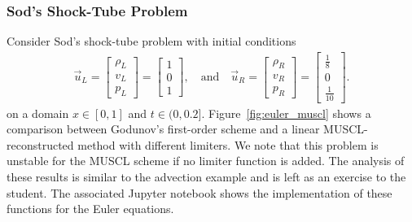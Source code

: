 \subsubsection{Sod's Shock-Tube Problem}
Consider Sod's shock-tube problem with initial conditions
\begin{align}
	\vec u_L = 
	\begin{bmatrix}
		\rho_L \\ v_L \\ p_L 
	\end{bmatrix}
	= 
	\begin{bmatrix}
		1 \\ 0 \\ 1
	\end{bmatrix},
	\quad \text{and} \quad 
	\vec u_R = 
	\begin{bmatrix}
		\rho_R \\ v_R \\ p_R
	\end{bmatrix}
	= 
	\begin{bmatrix}
		\frac{1}{8} \\ 0 \\ \frac{1}{10}
	\end{bmatrix}.
	\label{eq:39248243}
\end{align}
on a domain $x\in[0, 1]$ and $t\in(0,0.2]$. Figure~\ref{fig:euler_muscl} shows a comparison between Godunov's first-order scheme and a linear MUSCL-reconstructed method with different limiters. We note that this problem is unstable for the MUSCL scheme if no limiter function is added. 
The analysis of these results is similar to the advection example and is left as an exercise to the student. The associated Jupyter notebook shows the implementation of these functions for the Euler equations.

